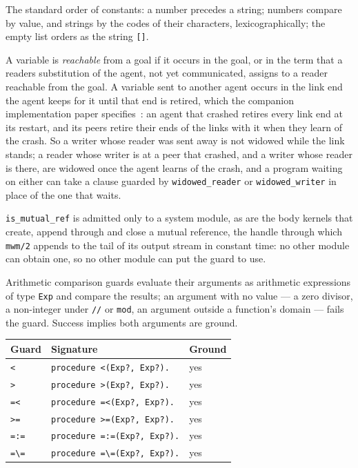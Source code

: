 The standard order of constants: a number precedes a string; numbers compare by value, and strings by the codes of their characters, lexicographically; the empty list orders as the string \verb|[]|.

A variable is \emph{reachable} from a goal if it occurs in the goal, or in the term that a readers substitution of the agent, not yet communicated, assigns to a reader reachable from the goal. A variable sent to another agent occurs in the link end the agent keeps for it until that end is retired, which the companion implementation paper specifies~\cite{shapiro2026implementing}: an agent that crashed retires every link end at its restart, and its peers retire their ends of the links with it when they learn of the crash. So a writer whose reader was sent away is not widowed while the link stands; a reader whose writer is at a peer that crashed, and a writer whose reader is there, are widowed once the agent learns of the crash, and a program waiting on either can take a clause guarded by \verb|widowed_reader| or \verb|widowed_writer| in place of the one that waits.

\verb|is_mutual_ref| is admitted only to a system module, as are the body kernels that create, append through and close a mutual reference, the handle through which \verb|mwm/2| appends to the tail of its output stream in constant time: no other module can obtain one, so no other module can put the guard to use.

Arithmetic comparison guards evaluate their arguments as arithmetic expressions of type \verb|Exp| and compare the results; an argument with no value --- a zero divisor, a non-integer under \verb|//| or \verb|mod|, an argument outside a function's domain --- fails the guard. Success implies both arguments are ground.

\begin{center}
\begin{tabular}{lll}
\textbf{Guard} & \textbf{Signature} & \textbf{Ground} \\
\hline
\verb|<| & \verb|procedure <(Exp?, Exp?).| & yes \\
\verb|>| & \verb|procedure >(Exp?, Exp?).| & yes \\
\verb|=<| & \verb|procedure =<(Exp?, Exp?).| & yes \\
\verb|>=| & \verb|procedure >=(Exp?, Exp?).| & yes \\
\verb|=:=| & \verb|procedure =:=(Exp?, Exp?).| & yes \\
\verb|=\=| & \verb|procedure =\=(Exp?, Exp?).| & yes \\
\end{tabular}
\end{center}

